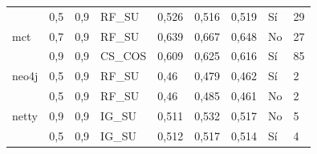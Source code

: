 \begin{table}[H]
{{\begin{tabular}{lllllllll}
                                & 0,5                               & 0,9                            & RF\_SU                                      & 0,526                                  & 0,516                               & 0,519                                 & Sí                               & 29                                        \\
mct                                  & 0,7                               & 0,9                            & RF\_SU                                      & 0,639                                  & 0,667                               & 0,648                                 & No                                   & 27                                        \\
                                  & 0,9                               & 0,9                            & CS\_COS                                     & 0,609                                  & 0,625                               & 0,616                                 & Sí                               & 85                                        \\
neo4j                                & 0,5                               & 0,9                            & RF\_SU                                      & 0,46                                   & 0,479                               & 0,462                                 & Sí                               & 2                                         \\
                                & 0,5                               & 0,9                            & RF\_SU                                      & 0,46                                   & 0,485                               & 0,461                                 & No                                   & 2                                         \\
netty                                & 0,9                               & 0,9                            & IG\_SU                                      & 0,511                                  & 0,532                               & 0,517                                 & No                                   & 5                                         \\
                                & 0,5                               & 0,9                            & IG\_SU                                      & 0,512                                  & 0,517                               & 0,514                                 & Sí                               & 4                                         \\

\end{tabular}}}
\end{table}
